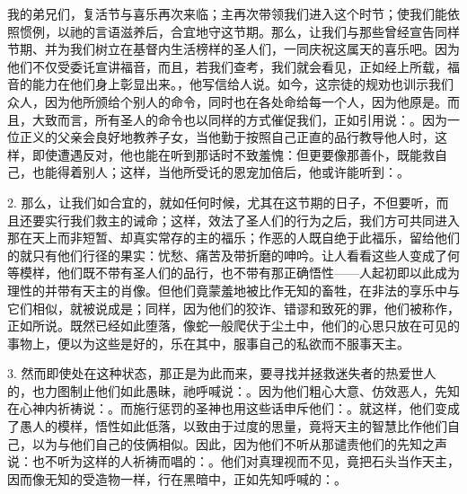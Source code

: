 我的弟兄们，复活节与喜乐再次来临；主再次带领我们进入这个时节；使我们能依照惯例，以祂的言语滋养后，合宜地守这节期。那么，让我们与那些曾经宣告同样节期、并为我们树立在基督内生活榜样的圣人们，一同庆祝这属天的喜乐吧。因为他们不仅受委讬宣讲福音，而且，若我们查考，我们就会看见，正如经上所载，福音的能力在他们身上彰显出来。，他写信给人说。如今，这宗徒的规劝也训示我们众人，因为他所颁给个别人的命令，同时也在各处命给每一个人，因为他原是。而且，大致而言，所有圣人的命令也以同样的方式催促我们，正如引用说：。因为一位正义的父亲会良好地教养子女，当他勤于按照自己正直的品行教导他人时，这样，即使遭遇反对，他也能在听到那话时不致羞愧：但更要像那善仆，既能救自己，也能得着别人；这样，当他所受讬的恩宠加倍后，他或许能听到：。\par

2. 那么，让我们如合宜的，就如任何时候，尤其在这节期的日子，不但要听，而且还要实行我们救主的诫命；这样，效法了圣人们的行为之后，我们方可共同进入那在天上而非短暂、却真实常存的主的福乐；作恶的人既自绝于此福乐，留给他们的就只有他们行径的果实：忧愁、痛苦及带折磨的呻吟。让人看看这些人变成了何等模样，他们既不带有圣人们的品行，也不带有那正确悟性——人起初即以此成为理性的并带有天主的肖像。但他们竟蒙羞地被比作无知的畜牲，在非法的享乐中与它们相似，就被说成是；同样，因为他们的狡诈、错谬和致死的罪，他们被称作，正如所说。既然已经如此堕落，像蛇一般爬伏于尘土中，他们的心思只放在可见的事物上，便以为这些是好的，乐在其中，服事自己的私欲而不服事天主。\par

3. 然而即使处在这种状态，那正是为此而来，要寻找并拯救迷失者的热爱世人的，也力图制止他们如此愚昧，祂呼喊说：。因为他们粗心大意、仿效恶人，先知在心神内祈祷说：。而施行惩罚的圣神也用这些话申斥他们：。就这样，他们变成了愚人的模样，悟性如此低落，以致由于过度的思量，竟将天主的智慧比作他们自己，以为与他们自己的伎俩相似。因此，因为他们不听从那谴责他们的先知之声说：也不听为这样的人祈祷而唱的：。他们对真理视而不见，竟把石头当作天主，因而像无知的受造物一样，行在黑暗中，正如先知呼喊的：。\par

